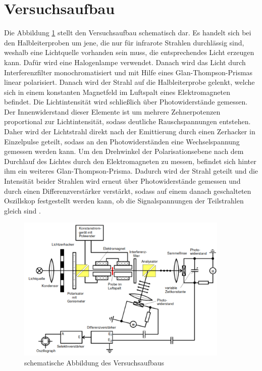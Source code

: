 \section{Versuchsaufbau}
\label{sec:Durchführung}

Die Abbildung \ref{abb1} stellt den Versuchsaufbau schematisch dar.
Es handelt sich bei den Halbleiterproben um jene, die nur 
für infrarote Strahlen durchlässig sind, weshalb eine Lichtquelle vorhanden sein 
muss, die entsprechendes Licht erzeugen kann.
Dafür wird eine Halogenlampe verwendet. 
Danach wird das Licht durch Interferenzfilter monochromatisiert und mit Hilfe eines 
Glan-Thompson-Prismas linear polarisiert. Danach wird der Strahl auf die 
Halbleiterprobe gelenkt, welche sich in einem konstanten Magnetfeld im Luftspalt 
eines Elektromagneten befindet. Die Lichtintensität wird schließlich über 
Photowiderstände gemessen. Der Innenwiderstand dieser Elemente ist um mehrere 
Zehnerpotenzen proportional zur Lichtintensität, sodass deutliche 
Rauschspannungen entstehen. Daher wird der Lichtstrahl direkt nach der 
Emittierung durch einen Zerhacker in Einzelpulse geteilt, sodass an den 
Photowiderständen eine Wechselspannung gemessen werden kann. 
Um den Drehwinkel der Polarisationsebene nach dem Durchlauf des Lichtes durch den 
Elektromagneten zu messen, befindet sich hinter ihm ein weiteres Glan-Thompson-Prisma.
Dadurch wird der Strahl geteilt und die Intensität beider Strahlen wird erneut 
über Photowiderstände gemessen und durch einen Differenzverstärker verstärkt,
sodass auf einem danach geschalteten Oszillskop festgestellt werden kann, ob die 
Signalspannungen der Teilstrahlen gleich sind \cite{sample}.

\begin{figure}
    \centering
    \includegraphics[width=0.9\textwidth]{figure/Aufbau.pdf}
    \caption{schematische Abbildung des Versuchsaufbaus \cite{sample}}
    \label{abb1}
\end{figure}

